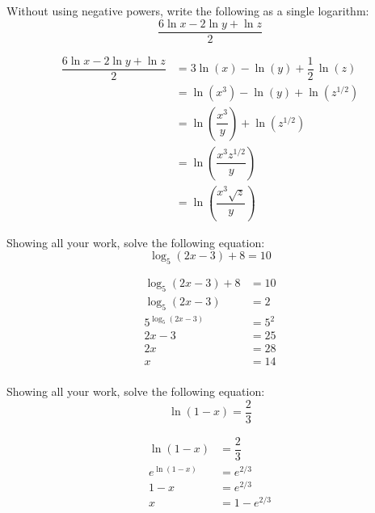 \documentclass[11pt,letterpaper]{article}
\begin{document}
\newpage



 Without using negative powers, write the following as a single logarithm: 
	\[
	\dfrac{6\ln x - 2\ln y + \ln z}{2}
	\] \pspace

\sol
	\[
	\begin{aligned}
	\dfrac{6\ln x - 2\ln y + \ln z}{2}&= 3\ln(x) - \ln(y) + \dfrac{1}{2}\,\ln(z) \\[0.3cm]
	&= \ln(x^3) - \ln(y) + \ln(z^{1/2}) \\[0.3cm]
	&= \ln \left( \dfrac{x^3}{y} \right) + \ln(z^{1/2}) \\[0.3cm]
	&= \ln \left( \dfrac{x^3z^{1/2}}{y} \right) \\[0.3cm]
	&= \ln \left( \dfrac{x^3 \sqrt{z}}{y} \right) 
	\end{aligned}
	\]



\newpage



 Showing all your work, solve the following equation: 
	\[
	\log_5(2x - 3) + 8= 10
	\] \pspace

\sol
	\[
	\begin{aligned}
	\log_5(2x - 3) + 8&= 10 \\[0.3cm]
	\log_5(2x - 3)&= 2 \\[0.3cm]
	5^{\log_5(2x - 3)}&= 5^2 \\[0.3cm]
	2x - 3&= 25 \\[0.3cm]
	2x&= 28 \\[0.3cm]
	x&= 14 \\[0.3cm]
	\end{aligned}
	\]



\newpage



 Showing all your work, solve the following equation: 
	\[
	\ln(1 - x)= \dfrac{2}{3}
	\] \pspace

\sol
	\[
	\begin{aligned}
	\ln(1 - x)&= \dfrac{2}{3} \\[0.3cm]
	e^{\ln(1 - x)}&= e^{2/3} \\[0.3cm]
	1 - x&= e^{2/3} \\[0.3cm]
	x&= 1 - e^{2/3}
	\end{aligned}
	\]



\newpage
\end{document}
